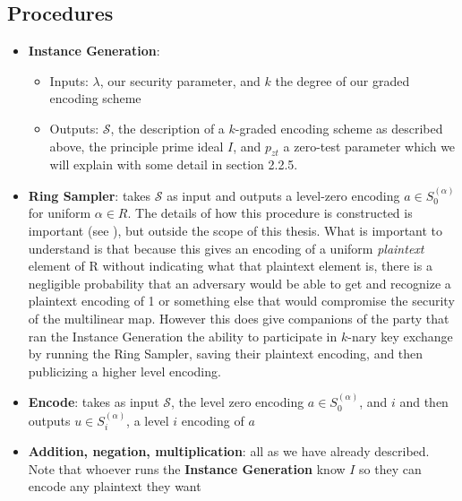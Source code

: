 \documentclass[12pt,twoside]{reedthesis}
\begin{document}
    \subsection{Procedures}
    \begin{itemize}
    \item \textbf{Instance Generation}: 
    	\begin{itemize}
    \item Inputs: $\lambda$, our security parameter, and $k$ the degree of our graded encoding scheme
    \item Outputs: $\mathcal{S}$, the description of a $k$-graded encoding scheme as described above, the principle prime ideal $I$, and $p_{zt}$ a zero-test parameter which we will explain with some detail in section 2.2.5.
    	\end{itemize}  
	\item \textbf{Ring Sampler}: takes $\mathcal{S}$ as input and outputs a level-zero encoding $a \in S_0^{(\alpha)}$ for uniform $\alpha \in R$. The details of how this procedure is constructed is important (see \cite{GGH13}), but outside the scope of this thesis. What is important to understand is that because this gives an encoding of a uniform \textit{plaintext} element of R without  indicating what that plaintext element is, there is a negligible probability that an adversary would be able to get and recognize a plaintext encoding of 1 or something else that would compromise the security of the multilinear map. However this does give companions of the party that ran the Instance Generation the ability to participate in $k$-nary key exchange by running the Ring Sampler, saving their plaintext encoding, and then publicizing a higher level encoding.
	\item \textbf{Encode}: takes as input $\mathcal{S}$, the level zero encoding $a\in S_0^{(\alpha)}$, and $i$ and then outputs $u\in S_i^{(\alpha)}$, a level $i$ encoding of $a$
	\item \textbf{Addition, negation, multiplication}: all as we have already described. Note that whoever runs the \textbf{Instance Generation} know $I$ so they can encode any plaintext they want
	
    \end{itemize}
    
\end{document}
